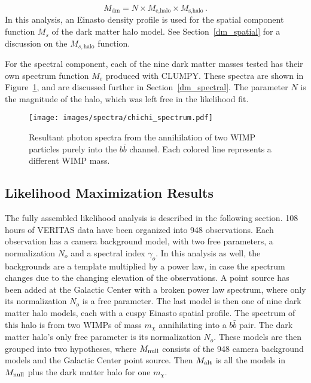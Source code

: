 \begin{equation}\label{eqn:dmmodel}
  M_{\textrm{dm}} = N \times M_{\textrm{e,halo}} \times M_{\textrm{s,halo}} \,.
\end{equation}
In this analysis, an Einasto density profile is used for the spatial component function $M_s$ of the dark matter halo model.
See Section~\ref{dm_spatial} for a discussion on the $M_{s,\textrm{halo}}$ function.

For the spectral component, each of the nine dark matter masses tested has their own spectrum function $M_e$ produced with CLUMPY.
These spectra are shown in Figure~\ref{fig:chichi_spectrum2}, and are discussed further in Section~\ref{dm_spectral}.
The parameter $N$ is the magnitude of the halo, which was left free in the likelihood fit.

\begin{figure}[bt]
  \centering
  \texttt{[image: images/spectra/chichi\_spectrum.pdf]}
  \caption[Single Annihilation Spectra]{
    Resultant photon spectra from the annihilation of two WIMP particles purely into the $b\bar{b}$ channel.
    Each colored line represents a different WIMP mass.
  }
  \label{fig:chichi_spectrum2}
\end{figure}

\FloatBarrier

\subsection{Likelihood Maximization Results}\label{like_results}

The fully assembled likelihood analysis is described in the following section.
108 hours of VERITAS data have been organized into 948 observations.
Each observation has a camera background model, with two free parameters, a normalization $N_o$ and a spectral index $\gamma_o$.
In this analysis as well, the backgrounds are a template multiplied by a power law, in case the spectrum changes due to the changing elevation of the observations.
A point source has been added at the Galactic Center with a broken power law spectrum, where only its normalization $N_o$ is a free parameter.
The last model is then one of nine dark matter halo models, each with a cuspy Einasto spatial profile.
The spectrum of this halo is from two WIMPs of mass $m_{\chi}$ annihilating into a $b\bar{b}$ pair.
The dark matter halo's only free parameter is its normalization $N_o$.
These models are then grouped into two hypotheses, where $M_\textrm{null}$ consists of the 948 camera background models and the Galactic Center point source.
Then $M_\textrm{alt}$ is all the models in $M_\textrm{null}$ plus the dark matter halo for one $m_{\chi}$.
  
